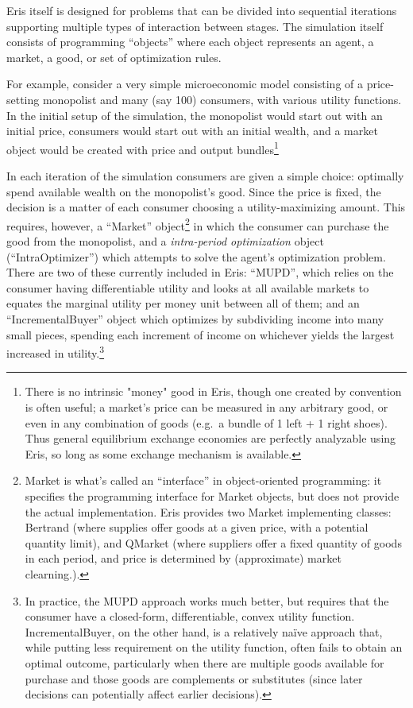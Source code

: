 \documentclass[12pt]{article}
\numberwithin{equation}{subsection}
\begin{document}
Eris itself is designed for problems that can be divided into sequential iterations supporting multiple
types of interaction between stages.  The simulation itself consists of programming ``objects''
where each object represents an agent, a market, a good, or set of optimization rules.

For example, consider a very simple microeconomic model consisting of a price-setting monopolist and
many (say 100) consumers, with various utility functions.  In the initial setup of the simulation,
the monopolist would start out with an initial price, consumers would start out with an initial
wealth, and a market object would be created with price and output bundles\footnote{There is no
    intrinsic "money" good in Eris, though one created by convention is often useful; a market's
    price can be measured in any arbitrary good, or even in any combination of goods (e.g.\ a bundle
    of 1 left + 1 right shoes).  Thus general equilibrium exchange economies are perfectly
analyzable using Eris, so long as some exchange mechanism is available.}

In each iteration of the simulation consumers are given a simple choice: optimally spend available
wealth on the monopolist's good.  Since the price is fixed, the decision is a matter of each
consumer choosing a utility-maximizing amount.  This requires, however, a ``Market''
object\footnote{\label{note:mktint}Market is what's called an ``interface'' in object-oriented
    programming: it specifies the programming interface for Market objects, but does not provide the
    actual implementation.  Eris provides two Market implementing classes: Bertrand (where supplies
    offer goods at a given price, with a potential quantity limit), and QMarket (where suppliers
    offer a fixed quantity of goods in each period, and price is determined by (approximate) market
    clearning.).
} in which the consumer can purchase the good from the monopolist, and a \emph{intra-period
optimization} object (``IntraOptimizer'') which attempts to solve the agent's optimization problem.
There are two of these currently included in Eris: ``MUPD'', which relies on the consumer having
differentiable utility and looks at all available markets to equates the marginal utility per money
unit between all of them; and an ``IncrementalBuyer'' object which optimizes by subdividing income
into many small pieces, spending each increment of income on whichever yields the largest increased
in utility.\footnote{In practice, the MUPD approach works much better, but requires that the
    consumer have a closed-form, differentiable, convex utility function.  IncrementalBuyer, on the
    other hand, is a relatively naïve approach that, while putting less requirement on the utility
    function, often fails to obtain an optimal outcome, particularly when there are multiple goods
    available for purchase and those goods are complements or substitutes (since later decisions can
    potentially affect earlier decisions).
}
\end{document}
